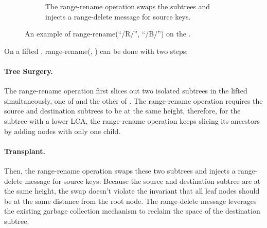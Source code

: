 \begin{figure}
\begin{subfigure}{\textwidth}
        \caption{\label{subfig:rr-3} The range-rename operation swaps the subtrees and
            injects a range-delete message for source keys.}
    \end{subfigure}
    \caption[A range-rename example]{\label{fig:rr}
        An example of range-rename(``/R/'', ``/B/'') on the \bet.}
\end{figure}

On a lifted \bet, range-rename(\spre, \dpre) can be done with two steps:

\paragraph{Tree Surgery.}
The range-rename operation first slices out two isolated subtrees in the lifted
\bet simultaneously, one of \spre and the other of \dpre.
The range-rename operation requires the source and destination subtrees to be at
the same height,
therefore, for the subtree with a lower LCA, the range-rename operation keeps
slicing its ancestors by adding nodes with only one child.

\paragraph{Transplant.}
Then, the range-rename operation swaps these two subtrees and injects a
range-delete message for source keys.
Because the source and destination subtree are at the same height, the swap
doesn't violate the \bet invariant that all leaf nodes should be at the same
distance from the root node.
The range-delete message leverages the existing garbage collection mechanism
to reclaim the space of the destination subtree.

